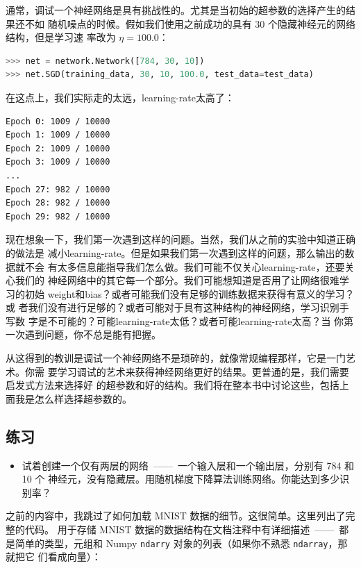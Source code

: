 通常，调试一个神经网络是具有挑战性的。尤其是当初始的超参数的选择产生的结果还不如
随机噪点的时候。假如我们使用之前成功的具有 30 个隐藏神经元的网络结构，但是学习速
率改为 $\eta = 100.0$：

\begin{lstlisting}[language=Python]
>>> net = network.Network([784, 30, 10])
>>> net.SGD(training_data, 30, 10, 100.0, test_data=test_data)
\end{lstlisting}

在这点上，我们实际走的太远，\gls*{learning-rate}太高了：

\begin{lstlisting}[language=sh]
Epoch 0: 1009 / 10000
Epoch 1: 1009 / 10000
Epoch 2: 1009 / 10000
Epoch 3: 1009 / 10000
...
Epoch 27: 982 / 10000
Epoch 28: 982 / 10000
Epoch 29: 982 / 10000
\end{lstlisting}

现在想象一下，我们第一次遇到这样的问题。当然，我们从之前的实验中知道正确的做法是
减小\gls*{learning-rate}。但是如果我们第一次遇到这样的问题，那么输出的数据就不会
有太多信息能指导我们怎么做。我们可能不仅关心\gls*{learning-rate}，还要关心我们的
神经网络中的其它每一个部分。我们可能想知道是否用了让网络很难学习的初始%
\gls*{weight}和\gls*{bias}？或者可能我们没有足够的训练数据来获得有意义的学习？或
者我们没有进行足够的\epoch{}？或者可能对于具有这种结构的神经网络，学习识别手写数
字是不可能的？可能\gls*{learning-rate}太低？或者可能\gls*{learning-rate}太高？当
你第一次遇到问题，你不总是能有把握。

从这得到的教训是调试一个神经网络不是琐碎的，就像常规编程那样，它是一门艺术。你需
要学习调试的艺术来获得神经网络更好的结果。更普通的是，我们需要启发式方法来选择好
的超参数和好的结构。我们将在整本书中讨论这些，包括上面我是怎么样选择超参数的。

\subsection*{练习}

\begin{itemize}
\item 试着创建一个仅有两层的网络~——~一个输入层和一个输出层，分别有 784 和 10 个
  神经元，没有隐藏层。用随机梯度下降算法训练网络。你能达到多少识别率？
\end{itemize}

之前的内容中，我跳过了如何加载 MNIST 数据的细节。这很简单。这里列出了完整的代码。
用于存储 MNIST 数据的数据结构在文档注释中有详细描述~——~都是简单的类型，元组和
Numpy \lstinline!ndarry! 对象的列表（如果你不熟悉 \lstinline!ndarray!，那就把它
  们看成向量）：

